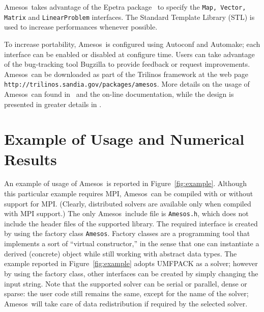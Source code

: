 \documentclass{llncs}
\newcommand{\amesos}{{\sc Amesos}}
\begin{document}
\amesos\ takes advantage of the {\sc Epetra} package~\cite{Epetra-Ref-Guide}
to specify the {\tt Map, Vector, Matrix} and {\tt LinearProblem} interfaces.
The Standard Template Library (STL) is used to increase performances
whenever possible.

To increase portability, \amesos\ is configured using
Autoconf and Automake; each
interface can be enabled or disabled at configure time. Users can
take advantage of the bug-tracking tool Bugzilla to
provide feedback or request improvements. \amesos\ can be downloaded as part of
the Trilinos framework at the web
page
\verb!http://trilinos.sandia.gov/packages/amesos!. More details on
the usage of \amesos\ can found in~\cite{Amesos-Reference-Guide} and the
on-line documentation, while the
design is presented in greater details in \cite{sala06design}.

\section{Example of Usage and Numerical Results}
\label{sec:numerical}

An example of usage of \amesos\ is reported in Figure~\ref{fig:example}.
Although this particular example requires MPI, \amesos\ can be compiled with
or without support for MPI.  (Clearly, distributed solvers are available only
when compiled with MPI support.) The only \amesos\ include file is
\verb!Amesos.h!, which does not include the header files of the supported
library.  The required interface is created by using the factory class \verb!Amesos!.
Factory classes are a programming tool that implements a sort of ``virtual
constructor,'' in the sense that one can instantiate a derived (concrete)
object while still working with abstract data types. The example reported in
Figure~\ref{fig:example} adopts UMFPACK as a solver; however by using the
factory class, other interfaces can be created by simply changing the
input string. Note that the supported solver can be serial or
parallel, dense or sparse: the user code still remains the same, except for
the name of the solver; \amesos\ will take care of data redistribution if
required by the selected solver.
\end{document}

